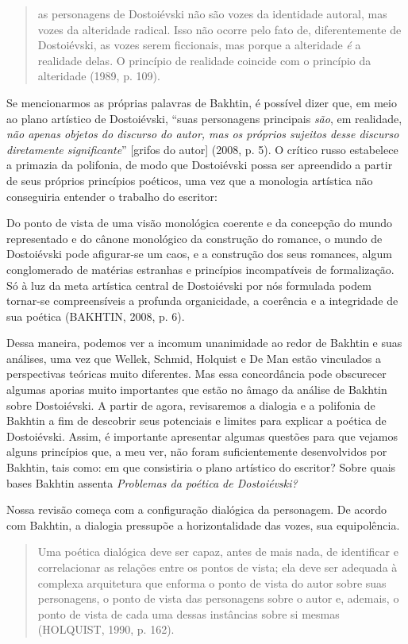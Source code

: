 \begin{quote}
as personagens de Dostoiévski não são vozes da identidade autoral, mas
vozes da alteridade radical. Isso não ocorre pelo fato de,
diferentemente de Dostoiévski, as vozes serem ficcionais, mas porque a
alteridade \emph{é} a realidade delas. O princípio de realidade coincide
com o princípio da alteridade (1989, p. 109).
\end{quote}

Se mencionarmos as próprias palavras de Bakhtin, é possível dizer que,
em meio ao plano artístico de Dostoiévski, ``suas personagens principais
\emph{são}, em realidade, \emph{não apenas objetos do discurso do autor,
mas os próprios sujeitos desse discurso diretamente significante}''
{[}grifos do autor{]} (2008, p. 5). O crítico russo estabelece a
primazia da polifonia, de modo que Dostoiévski possa ser apreendido a
partir de seus próprios princípios poéticos, uma vez que a monologia
artística não conseguiria entender o trabalho do escritor:

Do ponto de vista de uma visão monológica coerente e da concepção do
mundo representado e do cânone monológico da construção do romance, o
mundo de Dostoiévski pode afigurar-se um caos, e a construção dos seus
romances, algum conglomerado de matérias estranhas e princípios
incompatíveis de formalização. Só à luz da meta artística central de
Dostoiévski por nós formulada podem tornar-se compreensíveis a profunda
organicidade, a coerência e a integridade de sua poética (BAKHTIN, 2008,
p. 6).

Dessa maneira, podemos ver a incomum unanimidade ao redor de Bakhtin e
suas análises, uma vez que Wellek, Schmid, Holquist e De Man estão
vinculados a perspectivas teóricas muito diferentes. Mas essa
concordância pode obscurecer algumas aporias muito importantes que estão
no âmago da análise de Bakhtin sobre Dostoiévski. A partir de agora,
revisaremos a dialogia e a polifonia de Bakhtin a fim de descobrir seus
potenciais e limites para explicar a poética de Dostoiévski. Assim, é
importante apresentar algumas questões para que vejamos alguns
princípios que, a meu ver, não foram suficientemente desenvolvidos por
Bakhtin, tais como: em que consistiria o plano artístico do escritor?
Sobre quais bases Bakhtin assenta \emph{Problemas da poética de
Dostoiévski? }

Nossa revisão começa com a configuração dialógica da personagem. De
acordo com Bakhtin, a dialogia pressupõe a horizontalidade das vozes,
sua equipolência.

\begin{quote}
Uma poética dialógica deve ser capaz, antes de mais nada, de identificar
e correlacionar as relações entre os pontos de vista; ela deve ser
adequada à complexa arquitetura que enforma o ponto de vista do autor
sobre suas personagens, o ponto de vista das personagens sobre o autor
e, ademais, o ponto de vista de cada uma dessas instâncias sobre si
mesmas (HOLQUIST, 1990, p. 162).
\end{quote}

